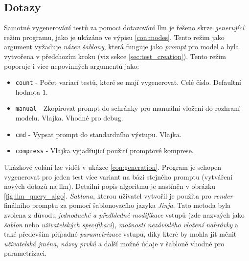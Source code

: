 \documentclass[czech, ma, kiv, he, iso690alph, pdf, viewonly]{fasthesis}
\begin{document}
        \subsection{Dotazy}
        Samotné vygenerování testů za pomoci dotazování \Gls{llm} je řešeno skrze \textit{generující} režim programu, jako je ukázáno ve výpisu \ref{con:modes}. Tento režim jako argument vyžaduje \textit{název šablony}, která funguje jako \textit{prompt} pro model a byla vytvořena v předchozím kroku (viz sekce \ref{sec:test_creation}). Tento režim poporuje i více nepovinných argumentů jako:
        \begin{itemize}
            \item \verb|count| - Počet variací testů, které se mají vygenerovat. Celé číslo. Defaultní hodnota \(1\).
            \item \verb|manual| - Zkopírovat prompt do schránky pro manuální vložení do rozhraní modelu. Vlajka. Vhodné pro debug.
            \item \verb|cmd| - Vypsat prompt do standardního výstupu. Vlajka.
            \item \verb|compress| - Vlajka vyjadřující použití promptové komprese.
        \end{itemize}
        Ukázkové volání lze vidět v ukázce \ref{con:generation}. Program je schopen vygenerovat pro jeden test více variant na bázi stejného promptu (vytváření nových dotazů na \Gls{llm}). Detailní popis algoritmu je nastíněn v obrázku \ref{fig:llm_query_algo}. \textit{Šablona}, kterou uživatel vytvořil je použita pro \emph{render} finálního promptu za pomocí šablonovacího jazyka \textit{Jinja}. Tato metoda byla zvolena z důvodu \textit{jednoduché a předhledné modifikace} vstupů (zde nazvaých jako \textit{šablon} nebo \textit{uživatelských specifikací}), \textit{možnosti nezávislého vložení nahrávky} a také především případné \textit{parametrizace} vstupu, díky které by mohla jít měnit \textit{uživatelská jména}, \textit{názvy prvků} a další možné údaje v šabloně vhodné pro parametrizaci. 
\end{document}
